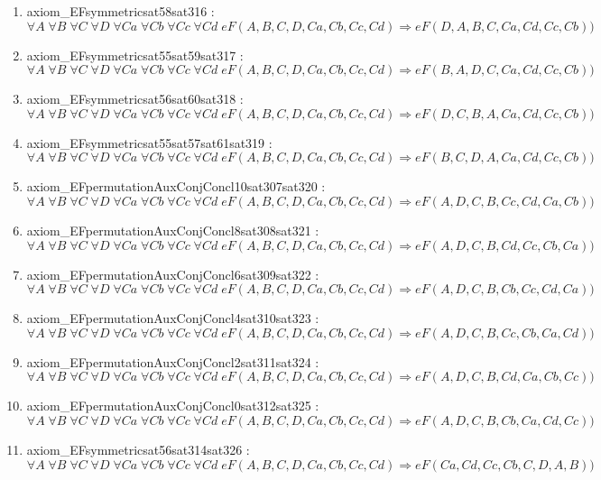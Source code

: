 \documentclass{article}
\begin{document}
\begin{enumerate}
\item axiom\_EFsymmetricsat58sat316 : $\forall A\;\forall B\;\forall C\;\forall D\;\forall Ca\;\forall Cb\;\forall Cc\;\forall Cd\;eF(A, B, C, D, Ca, Cb, Cc, Cd) \Rightarrow eF(D, A, B, C, Ca, Cd, Cc, Cb))$
\item axiom\_EFsymmetricsat55sat59sat317 : $\forall A\;\forall B\;\forall C\;\forall D\;\forall Ca\;\forall Cb\;\forall Cc\;\forall Cd\;eF(A, B, C, D, Ca, Cb, Cc, Cd) \Rightarrow eF(B, A, D, C, Ca, Cd, Cc, Cb))$
\item axiom\_EFsymmetricsat56sat60sat318 : $\forall A\;\forall B\;\forall C\;\forall D\;\forall Ca\;\forall Cb\;\forall Cc\;\forall Cd\;eF(A, B, C, D, Ca, Cb, Cc, Cd) \Rightarrow eF(D, C, B, A, Ca, Cd, Cc, Cb))$
\item axiom\_EFsymmetricsat55sat57sat61sat319 : $\forall A\;\forall B\;\forall C\;\forall D\;\forall Ca\;\forall Cb\;\forall Cc\;\forall Cd\;eF(A, B, C, D, Ca, Cb, Cc, Cd) \Rightarrow eF(B, C, D, A, Ca, Cd, Cc, Cb))$
\item axiom\_EFpermutationAuxConjConcl10sat307sat320 : $\forall A\;\forall B\;\forall C\;\forall D\;\forall Ca\;\forall Cb\;\forall Cc\;\forall Cd\;eF(A, B, C, D, Ca, Cb, Cc, Cd) \Rightarrow eF(A, D, C, B, Cc, Cd, Ca, Cb))$
\item axiom\_EFpermutationAuxConjConcl8sat308sat321 : $\forall A\;\forall B\;\forall C\;\forall D\;\forall Ca\;\forall Cb\;\forall Cc\;\forall Cd\;eF(A, B, C, D, Ca, Cb, Cc, Cd) \Rightarrow eF(A, D, C, B, Cd, Cc, Cb, Ca))$
\item axiom\_EFpermutationAuxConjConcl6sat309sat322 : $\forall A\;\forall B\;\forall C\;\forall D\;\forall Ca\;\forall Cb\;\forall Cc\;\forall Cd\;eF(A, B, C, D, Ca, Cb, Cc, Cd) \Rightarrow eF(A, D, C, B, Cb, Cc, Cd, Ca))$
\item axiom\_EFpermutationAuxConjConcl4sat310sat323 : $\forall A\;\forall B\;\forall C\;\forall D\;\forall Ca\;\forall Cb\;\forall Cc\;\forall Cd\;eF(A, B, C, D, Ca, Cb, Cc, Cd) \Rightarrow eF(A, D, C, B, Cc, Cb, Ca, Cd))$
\item axiom\_EFpermutationAuxConjConcl2sat311sat324 : $\forall A\;\forall B\;\forall C\;\forall D\;\forall Ca\;\forall Cb\;\forall Cc\;\forall Cd\;eF(A, B, C, D, Ca, Cb, Cc, Cd) \Rightarrow eF(A, D, C, B, Cd, Ca, Cb, Cc))$
\item axiom\_EFpermutationAuxConjConcl0sat312sat325 : $\forall A\;\forall B\;\forall C\;\forall D\;\forall Ca\;\forall Cb\;\forall Cc\;\forall Cd\;eF(A, B, C, D, Ca, Cb, Cc, Cd) \Rightarrow eF(A, D, C, B, Cb, Ca, Cd, Cc))$
\item axiom\_EFsymmetricsat56sat314sat326 : $\forall A\;\forall B\;\forall C\;\forall D\;\forall Ca\;\forall Cb\;\forall Cc\;\forall Cd\;eF(A, B, C, D, Ca, Cb, Cc, Cd) \Rightarrow eF(Ca, Cd, Cc, Cb, C, D, A, B))$

\end{enumerate}
\end{document}
